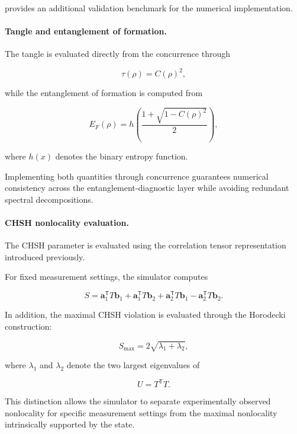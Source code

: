 provides an additional validation benchmark for the numerical implementation.

\medskip

\paragraph{Tangle and entanglement of formation.}

The tangle is evaluated directly from the concurrence through

\[
\tau(\rho)
=
C(\rho)^2,
\]

while the entanglement of formation is computed from

\[
E_F(\rho)
=
h
\left(
\frac{
1+\sqrt{1-C(\rho)^2}
}{2}
\right),
\]

where \( h(x) \) denotes the binary entropy function.

\medskip

Implementing both quantities through concurrence guarantees numerical consistency across the entanglement-diagnostic layer while avoiding redundant spectral decompositions.

\medskip

\paragraph{CHSH nonlocality evaluation.}

The CHSH parameter is evaluated using the correlation tensor representation introduced previously.

For fixed measurement settings, the simulator computes

\[
S
=
\mathbf{a}_1^{\mathsf T} T \mathbf{b}_1
+
\mathbf{a}_1^{\mathsf T} T \mathbf{b}_2
+
\mathbf{a}_2^{\mathsf T} T \mathbf{b}_1
-
\mathbf{a}_2^{\mathsf T} T \mathbf{b}_2.
\]

In addition, the maximal CHSH violation is evaluated through the Horodecki construction:

\[
S_{\max}
=
2\sqrt{\lambda_1+\lambda_2},
\]

where \( \lambda_1 \) and \( \lambda_2 \) denote the two largest eigenvalues of

\[
U=T^{\mathsf T}T.
\]

\medskip

This distinction allows the simulator to separate experimentally observed nonlocality for specific measurement settings from the maximal nonlocality intrinsically supported by the state.

\medskip

